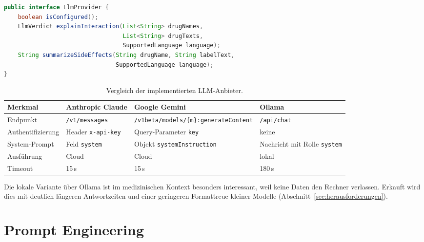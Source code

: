 \begin{lstlisting}[float=htbp, language=Java, caption={Das Interface \texttt{LlmProvider}.}, label={lst:provider}]
public interface LlmProvider {
    boolean isConfigured();
    LlmVerdict explainInteraction(List<String> drugNames,
                                  List<String> drugTexts,
                                  SupportedLanguage language);
    String summarizeSideEffects(String drugName, String labelText,
                                SupportedLanguage language);
}
\end{lstlisting}

\begin{table}[htbp]
  \centering
  \small
  \caption{Vergleich der implementierten LLM-Anbieter.}
  \label{tab:anbieter}
  \begin{tabularx}{\textwidth}{@{}l L L L@{}}
    \toprule
    Merkmal & Anthropic Claude & Google Gemini & Ollama \\
    \midrule
    Endpunkt          & \texttt{/v1/messages} & \texttt{/v1beta/models/}\allowbreak\texttt{\{m\}:generateContent} & \texttt{/api/chat} \\
    Authentifizierung & Header \texttt{x-api-key} & Query-Parameter \texttt{key} & keine \\
    System-Prompt     & Feld \texttt{system} & Objekt \texttt{systemInstruction} & Nachricht mit Rolle \texttt{system} \\
    Ausführung        & Cloud & Cloud & lokal \\
    Timeout           & 15\,s & 15\,s & 180\,s \\
    \bottomrule
  \end{tabularx}
\end{table}

Die lokale Variante über Ollama ist im medizinischen Kontext besonders interessant, weil keine Daten den Rechner verlassen. Erkauft wird dies mit deutlich längeren Antwortzeiten und einer geringeren Formattreue kleiner Modelle (Abschnitt~\ref{sec:herausforderungen}).

\section{Prompt Engineering}

